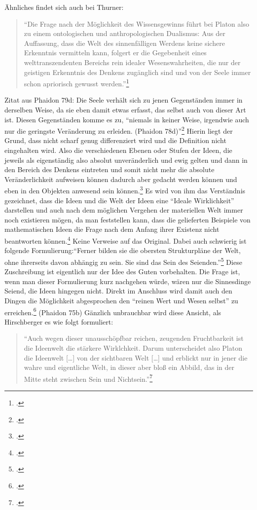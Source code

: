 \documentclass[12pt]{article}
\newcommand*{\zitatblock}[1]{%
    \begin{quote}
    \fontsize{10}{12}\selectfont
    \setlength{\parskip}{1.0em}
    #1
    \end{quote}
}
\begin{document}
Ähnliches findet sich auch bei Thurner:\zitatblock{\enquote{Die Frage nach der Möglichkeit des Wissensgewinns führt bei Platon also zu einem ontologischen und anthropologischen Dualismus: Aus der Auffassung, dass die Welt des sinnenfälligen Werdens keine sichere Erkenntnis vermitteln kann, folgert er die Gegebenheit eines welttranszendenten Bereichs rein idealer Wesenswahrheiten, die nur der geistigen Erkenntnis des Denkens zugänglich sind und von der Seele immer schon apriorisch gewusst werden.}\footcite[][S. 99]{ThurnerDualismus}}
Zitat aus Phaidon 79d: Die Seele verhält sich zu jenen Gegenständen immer in derselben Weise, da sie eben damit etwas erfasst, das selbst auch von dieser Art ist. Diesen Gegenständen komme es zu, \enquote{niemals in keiner Weise, irgendwie auch nur die geringste Veränderung zu erleiden. (Phaidon 78d)}\footcite[][S. 97]{Hirschberger}
Hierin liegt der Grund, dass nicht scharf genug differenziert wird und die Definition nicht eingehalten wird. Also die verschiedenen Ebenen oder Stufen der Ideen, die jeweils als eigenständig also absolut unveränderlich und ewig gelten und dann in den Bereich des Denkens eintreten und somit nicht mehr die absolute Veränderlichkeit aufweisen können dadurch aber gedacht werden können und eben in den Objekten anwesend sein können.\footcite[vgl.][S. 180f.]{Kutschera}
Es wird von ihm das Verständnis gezeichnet, dass die Ideen und die Welt der Ideen eine \enquote{Ideale Wirklichkeit} darstellen und auch nach dem möglichen Vergehen der materiellen Welt immer noch existieren mögen, da man feststellen kann, dass die gelieferten Beispiele von mathematischen Ideen die Frage nach dem Anfang ihrer Existenz nicht beantworten können.\footcite[vgl.][S. 99]{Hirschberger} Keine Verweise auf das Original. Dabei auch schwierig ist folgende Formulierung:\enquote{Ferner bilden sie die obersten Strukturpläne der Welt, ohne ihrerseits davon abhängig zu sein. Sie sind das Sein des Seienden.}\footcite[][S. 99]{Hirschberger} Diese Zuschreibung ist eigentlich nur der Idee des Guten vorbehalten. Die Frage ist, wenn man dieser Formulierung kurz nachgehen würde, wären nur die Sinnesdinge Seiend, die Ideen hingegen nicht.
Direkt im Anschluss wird damit auch den Dingen die Möglichkeit abgesprochen den \enquote{reinen Wert und Wesen selbst} zu erreichen.\footcite[vgl.][S. 100]{Hirschberger} (Phaidon 75b)
Gänzlich unbrauchbar wird diese Ansicht, als Hirschberger es wie folgt formuliert:
\zitatblock{\enquote{Auch wegen dieser unausschöpfbar reichen, zeugenden Fruchtbarkeit ist die Ideenwelt die stärkere Wirklchkeit. Darum unterscheidet also Platon die Ideenwelt [\dots] von der sichtbaren Welt [\dots] und erblickt nur in jener die wahre und eigentliche Welt, in dieser aber bloß ein Abbild, das in der Mitte steht zwischen Sein und Nichtsein.}\footcite[vgl.][S. 100]{Hirschberger}}
\end{document}
